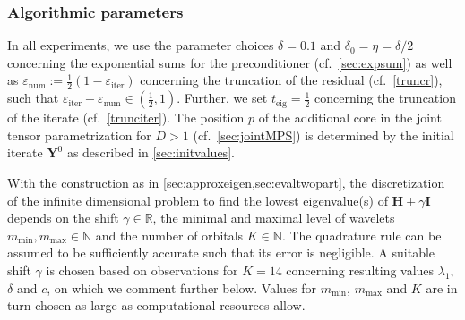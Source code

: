 \documentclass[a4paper,11pt,oneside]{amsart}
\theoremstyle{definition}
\theoremstyle{remark}
\newcommand{\R}{\mathbb{R}}
\newcommand{\N}{\mathbb{N}}
\newcommand{\ten}[1]{\boldsymbol{#1}}
\newcommand{\enum}{\ensuremath{\varepsilon_{\mathrm{num}}}}
\newcommand{\eiter}{\ensuremath{\varepsilon_{\mathrm{iter}}}}
\newcommand{\teig}{t_{\mathrm{eig}}}
\numberwithin{equation}{section}
\numberwithin{theorem}{section}
\begin{document}
\subsubsection{Algorithmic parameters}\label{sec:extrapol}
In all experiments, we use the parameter choices $\delta = 0.1$ and $\delta_0 = \eta = \delta/2$ concerning the exponential sums for the preconditioner (cf.~\cref{sec:expsum}) as well as 
$\enum := \frac{1}{2} (1 - \eiter)$ concerning the truncation of the residual (cf.~\cref{truncr}), such that $\eiter + \enum \in (\frac{1}{2},1)$. Further, we set $\teig = \frac{1}{2}$ concerning the truncation of the iterate (cf.~\cref{trunciter}). The position $p$ of the additional core in the joint tensor parametrization for $D > 1$ (cf.~\cref{sec:jointMPS}) is determined by the initial iterate $\ten Y^0$ as described in \cref{sec:initvalues}.

With the construction as in \cref{sec:approxeigen,sec:evaltwopart}, the discretization of the infinite dimensional problem to find the lowest eigenvalue(s) of $\ten H + \gamma \ten I$ depends on the shift $\gamma \in \R$, the minimal and maximal level of wavelets $m_{\min},m_{\max} \in \N$ and the number of orbitals $K \in \N$. The quadrature rule can be assumed to be  sufficiently accurate such that its error is negligible. A suitable shift $\gamma$ is chosen based on observations for $K = 14$ concerning resulting values $\lambda_1$, $\delta$ and $c$, on which we comment further below. Values for $m_{\min}$, $m_{\max}$ and $K$ are in turn chosen as large as computational resources allow.
\end{document}
